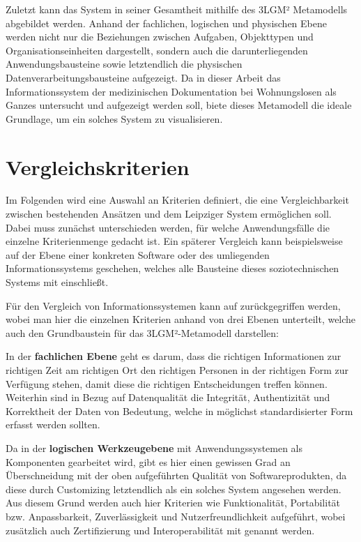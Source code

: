 Zuletzt kann das System in seiner Gesamtheit mithilfe des 3LGM² Metamodells abgebildet werden. Anhand der fachlichen, logischen und physischen Ebene werden nicht nur die Beziehungen zwischen Aufgaben, Objekttypen und Organisationseinheiten dargestellt, sondern auch die darunterliegenden Anwendungsbausteine sowie letztendlich die physischen Datenverarbeitungsbausteine aufgezeigt. Da in dieser Arbeit das Informationssystem der medizinischen Dokumentation bei Wohnungslosen als Ganzes untersucht und aufgezeigt werden soll, biete dieses Metamodell die ideale Grundlage, um ein solches System zu visualisieren.


\section{Vergleichskriterien}

Im Folgenden wird eine Auswahl an Kriterien definiert, die eine Vergleichbarkeit zwischen bestehenden Ansätzen und dem Leipziger System ermöglichen soll. Dabei muss zunächst unterschieden werden, für welche Anwendungsfälle die einzelne Kriterienmenge gedacht ist. Ein späterer Vergleich kann beispielsweise auf der Ebene einer konkreten Software oder des umliegenden Informationssystems geschehen, welches alle Bausteine dieses soziotechnischen Systems mit einschließt.

Für den Vergleich von Informationssystemen kann auf \citet{Winter.2023} zurückgegriffen werden, wobei man hier die einzelnen Kriterien anhand von drei Ebenen unterteilt, welche auch den Grundbaustein für das 3LGM²-Metamodell darstellen:

In der \textbf{fachlichen Ebene} geht es darum, dass die richtigen Informationen zur richtigen Zeit am richtigen Ort den richtigen Personen in der richtigen Form zur Verfügung stehen, damit diese die richtigen Entscheidungen treffen können. Weiterhin sind in Bezug auf Datenqualität die Integrität, Authentizität und Korrektheit der Daten von Bedeutung, welche in möglichst standardisierter Form erfasst werden sollten.

Da in der \textbf{logischen Werkzeugebene} mit Anwendungssystemen als Komponenten gearbeitet wird, gibt es hier einen gewissen Grad an Überschneidung mit der oben aufgeführten Qualität von Softwareprodukten, da diese durch Customizing letztendlich als ein solches System angesehen werden. Aus diesem Grund werden auch hier Kriterien wie Funktionalität, Portabilität bzw. Anpassbarkeit, Zuverlässigkeit und Nutzerfreundlichkeit aufgeführt, wobei zusätzlich auch Zertifizierung und Interoperabilität mit genannt werden.

